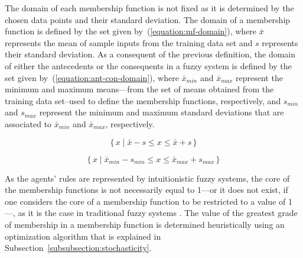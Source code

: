 \documentclass{ieeeaccess}
\begin{document}

The domain of each membership function is not fixed as it is determined by the chosen data points and their standard deviation. The domain of a membership function is defined by the set given by~(\ref{equation:mf-domain}), where $\bar{x}$ represents the mean of sample inputs from the training data set and $s$ represents their standard deviation. As a consequent of the previous definition, the domain of either the antecedents or the consequents in a fuzzy system is defined by the set given by~(\ref{equation:ant-con-domain}), where $\bar{x}_{min}$ and $\bar{x}_{max}$ represent the minimum and maximum means---from the set of means obtained from the training data set--used to define the membership functions, respectively, and $s_{min}$ and $s_{max}$ represent the minimum and maximum standard deviations that are associated to $\bar{x}_{min}$ and $\bar{x}_{max}$, respectively. %


\begin{equation}
  \label{equation:mf-domain}
  \{\,x \mid \bar{x} - s \leq x \leq \bar{x} + s \,\}
\end{equation}

\begin{equation}
  \label{equation:ant-con-domain}
  \{\,x \mid \bar{x}_{min} - s_{min} \leq x \leq \bar{x}_{max} + s_{max} \,\}
\end{equation}

As the agents' rules are represented by intuitionistic fuzzy systems, the core of the membership functions is not necessarily equal to 1---or it does not exist, if one considers the core of a membership function to be restricted to a value of 1---, as it is the case in traditional fuzzy systems \cite{wygralak2000axiomatic}. %
The value of the greatest grade of membership in a membership function is determined heuristically using an optimization algorithm that is explained in Subsection~\ref{subsubsection:stochasticity}.
\end{document}
